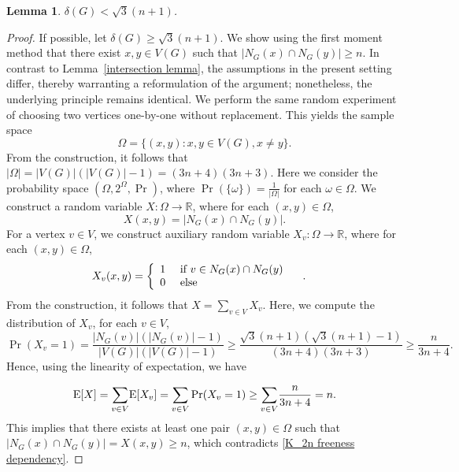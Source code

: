 \documentclass[reqno,10pt]{amsart}
\newtheorem{lemma}[theorem]{Lemma}
\theoremstyle{definition}
\newcommand{\Ex}{\ensuremath{{\textnormal{E}}}}
\begin{document}
\begin{lemma}\label{upper bound del(G)}
$\delta(G)< \sqrt{3}(n+1)$.
\end{lemma}
\begin{proof}
If possible, let $\delta(G)\geq \sqrt{3}(n+1)$. We show using the first moment method that there exist $x,y\in V(G)$ such that $|N_{G}(x)\cap N_{G}(y)|\geq n$. In contrast to Lemma~\ref{intersection lemma}, the assumptions in the present setting differ, thereby warranting a reformulation of the argument; nonetheless, the underlying principle remains identical. We perform the same random experiment of choosing two vertices one-by-one without replacement. This yields the sample space 
\begin{equation*}
\Omega= \{(x,y): x,y\in V(G), x\neq y\}.
\end{equation*}
From the construction, it follows that $|\Omega|=|V(G)|(|V(G)|-1)=(3n+4)(3n+3)$. Here we consider the probability space $(\Omega, 2^{\Omega}, \Pr)$, where $\Pr(\{\omega\})=\frac{1}{|\Omega|}$ for each $\omega\in\Omega$. We construct a random variable $X: \Omega \rightarrow \mathbb{R}$, where for each $(x,y)\in\Omega$,
\begin{equation*}
X(x,y)= |N_{G}(x)\cap N_{G}(y)|.
\end{equation*}
For a vertex $v\in V$, we construct auxiliary random variable $X_{v}:\Omega\rightarrow\mathbb{R}$, where  for each $(x,y)\in\Omega$,
\begin{align*}
X_{v}(x,y)&=\left\{\begin{array}{lll}
			1& \textnormal{ if  }  v\in N_{G}(x)\cap N_{G}(y)\\
			0& \textnormal{ else }&  
		\end{array}\right..
\end{align*}
From the construction, it follows that $X=\underset{v\in V}{\sum}X_{v}$. Here, we compute the distribution of $X_{v}$, for each $v\in V$,
\begin{equation*}
\Pr(X_{v}=1)=\frac{|N_{G}(v)|(|N_{G}(v)|-1)}{|V(G)|(|V(G)|-1)}\geq \frac{\sqrt{3}(n+1)(\sqrt{3}(n+1)-1)}{(3n+4)(3n+3)}\geq \frac{n}{3n+4}.
\end{equation*}
Hence, using the linearity of expectation, we have

\begin{equation*}
\Ex[X]=\underset{v\in V}{\sum}\Ex[X_{v}]=\underset{v\in V}{\sum}\Pr(X_{v}=1)\geq \underset{v\in V}{\sum}\frac{n}{3n+4}=n.
\end{equation*}
This implies that there exists at least one pair $(x,y)\in\Omega$ such that $|N_{G}(x)\cap N_{G}(y)|=X(x,y)\geq n$, which contradicts \eqref{K_2n freeness dependency}.
\end{proof}
\end{document}
